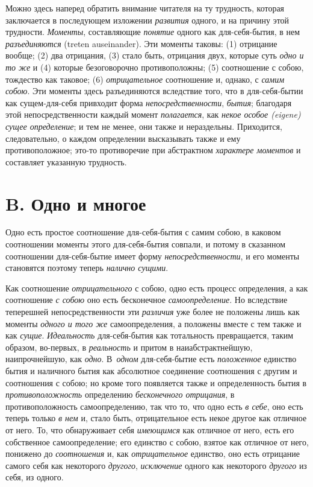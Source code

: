 Можно здесь наперед обратить внимание читателя на ту трудность, которая
заключается в последующем изложении {\em развития}
одного, и на причину этой трудности. {\em Моменты},
составляющие {\em понятие} одного как для-себя-бытия, в
нем {\em разъединяются} (treten auseinander). Эти
моменты таковы: (1) отрицание вообще; (2) два отрицания, (3) стало быть,
отрицания двух, которые суть {\em одно и то же} и (4)
которые безоговорочно противоположны; (5) соотношение с собою, тождество
как таковое; (6) {\em отрицательное} соотношение и,
однако, с {\em самим собою}. Эти моменты здесь
разъединяются вследствие того, что в для-себя-бытии как сущем-для-себя
привходит форма {\em непосредственности},
{\em бытия}; благодаря этой непосредственности каждый
момент {\em полагается}, как
{\em некое особое (eigene) сущее определение}; и тем не
менее, они также и нераздельны. Приходится, следовательно, о каждом
определении высказывать также и ему противоположное; это-то противоречие
при абстрактном {\em характере моментов} и составляет указанную трудность.

\section[B. Одно и многое]{B. Одно и многое}
Одно есть простое соотношение для-себя-бытия с самим собою, в каковом
соотношении моменты этого для-себя-бытия совпали, и потому в сказанном
соотношении для-себя-бытие имеет форму
{\em непосредственности}, и его моменты становятся
поэтому теперь {\em налично сущими}.

Как соотношение {\em отрицательного} с собою, одно есть
процесс определения, а как соотношение {\em с собою}
оно есть бесконечное {\em самоопределение}. Но
вследствие теперешней непосредственности эти
{\em различия} уже более не положены лишь как моменты
{\em одного и того же} самоопределения, а положены
вместе с тем также и как {\em сущие}.
{\em Идеальность} для-себя-бытия как тотальность
превращается, таким образом, во-первых, в
{\em реальность} и притом в наиабстрактнейшую,
наипрочнейшую, как {\em одно}. В~{\em одном} для-себя-бытие есть
{\em положенное} единство бытия и наличного бытия как
абсолютное соединение соотношения с другим и соотношения с собою; но кроме
того появляется также и определенность бытия в
{\em противоположность} определению
{\em бесконечного отрицания}, в противоположность
самоопределению, так что то, что одно есть {\em в
себе}, оно есть теперь только {\em в нем} и, стало
быть, отрицательное есть некое другое как отличное от него. То, что
обнаруживает себя {\em имеющимся} как отличное от него,
есть его собственное самоопределение; его единство с собою, взятое как
отличное от него, понижено до {\em соотношения} и, как
{\em отрицательное} единство, оно есть отрицание самого
себя как некоторого {\em другого}, {\em исключение} одного как некоторого
{\em другого} из себя, из одного.

